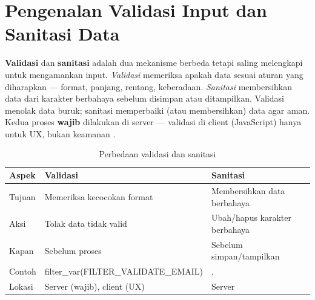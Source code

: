 ﻿\section{Pengenalan Validasi Input dan Sanitasi Data}

\textbf{Validasi} dan \textbf{sanitasi} adalah dua mekanisme berbeda tetapi saling melengkapi untuk mengamankan input. \textit{Validasi} memeriksa apakah data sesuai aturan yang diharapkan --- format, panjang, rentang, keberadaan. \textit{Sanitasi} membersihkan data dari karakter berbahaya sebelum disimpan atau ditampilkan. Validasi menolak data buruk; sanitasi memperbaiki (atau membersihkan) data agar aman. Kedua proses \textbf{wajib} dilakukan di server --- validasi di client (JavaScript) hanya untuk UX, bukan keamanan \cite{phpRightWay}.

\begin{table}[H]
\centering
\footnotesize
\setlength{\tabcolsep}{3pt}
\begin{tabular}{|P{2.1cm}|P{4.95cm}|P{5.35cm}|}
\hline
\textbf{Aspek} & \textbf{Validasi} & \textbf{Sanitasi} \\
\hline
Tujuan & Memeriksa kecocokan format & Membersihkan data berbahaya \\
\hline
Aksi & Tolak data tidak valid & Ubah/hapus karakter berbahaya \\
\hline
Kapan & Sebelum proses & Sebelum simpan/tampilkan \\
\hline
Contoh & \parbox[t]{4.95cm}{\raggedright\ttfamily\scriptsize filter\_var(FILTER\_VALIDATE\_EMAIL)} & ,  \\
\hline
Lokasi & Server (wajib), client (UX) & Server \\
\hline
\end{tabular}
\caption{Perbedaan validasi dan sanitasi}
\end{table}

